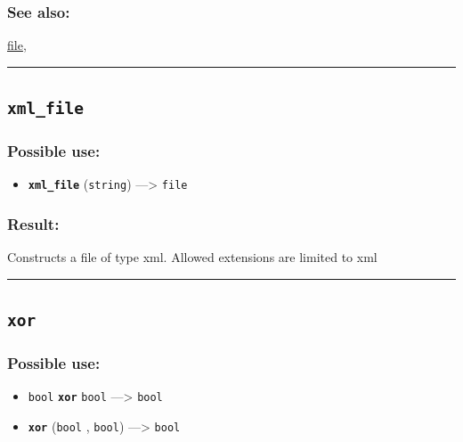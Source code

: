 \documentclass[]{book}
\providecommand{\tightlist}{%
  \setlength{\itemsep}{0pt}\setlength{\parskip}{0pt}}
\theoremstyle{definition}
\theoremstyle{definition}
\theoremstyle{definition}
\theoremstyle{remark}
\begin{document}
\subsubsection{See also:}\label{see-also-225}

\href{operators-d-to-h.html\#file}{file},

\begin{center}\rule{0.5\linewidth}{\linethickness}\end{center}

\subsection{\texorpdfstring{\texttt{xml\_file}}{xml\_file}}\label{xml_file}

\subsubsection{Possible use:}\label{possible-use-565}

\begin{itemize}
\tightlist
\item
  \textbf{\texttt{xml\_file}} (\texttt{string}) ---\textgreater{}
  \texttt{file}
\end{itemize}

\subsubsection{Result:}\label{result-544}

Constructs a file of type xml. Allowed extensions are limited to xml

\begin{center}\rule{0.5\linewidth}{\linethickness}\end{center}

\subsection{\texorpdfstring{\texttt{xor}}{xor}}\label{xor}

\subsubsection{Possible use:}\label{possible-use-566}

\begin{itemize}
\tightlist
\item
  \texttt{bool} \textbf{\texttt{xor}} \texttt{bool} ---\textgreater{}
  \texttt{bool}
\item
  \textbf{\texttt{xor}} (\texttt{bool} , \texttt{bool})
  ---\textgreater{} \texttt{bool}
\end{itemize}
\end{document}

